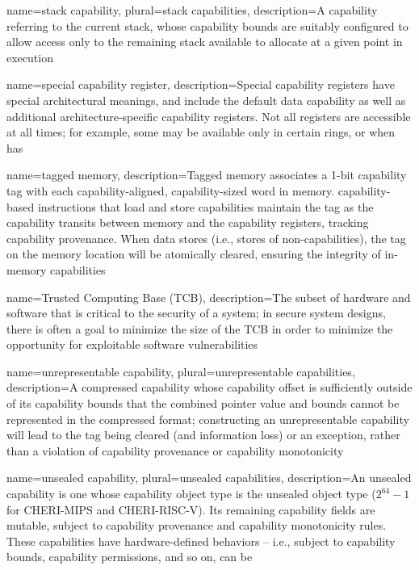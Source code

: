{
  name=stack capability,
  plural=stack capabilities,
  description={A \gls{capability} referring to the current stack, whose
    \gls{capability bounds} are suitably configured to allow access only to
    the remaining stack available to allocate at a given point in execution}
}

{
  name=special capability register,
  description={Special capability registers have special architectural
    meanings, and include the \gls{default data capability} as well
    as additional architecture-specific capability registers.
    Not all registers are accessible at all times; for example, some may be
    available only in certain rings, or when \PCC{} has
    \cappermASR{}}
}

{
  name=tagged memory,
  description={Tagged memory associates a 1-bit \gls{capability tag} with
    each \gls{capability}-aligned, capability-sized word in memory.
    \Gls{capability-based instructions} that load and store capabilities
    maintain the tag as the capability transits between memory and the
    \glspl{capability register}, tracking \gls{capability provenance}.
    When data stores (i.e., stores of non-capabilities), the tag on the
    memory location will be atomically cleared, ensuring the integrity of
    in-memory capabilities}
}

{
  name=Trusted Computing Base (TCB),
  description={The subset of hardware and software that is critical to the
    security of a system;
    in secure system designs, there is often a goal to minimize the size of
    the TCB in order to minimize the opportunity for exploitable software
    vulnerabilities}
}

{
  name=unrepresentable capability,
  plural=unrepresentable capabilities,
  description={A \gls{compressed capability} whose \gls{capability offset} is
    sufficiently outside of its \gls{capability bounds} that the combined
    \gls{pointer} value and bounds cannot be represented in the compressed format;
    constructing an unrepresentable capability will lead to the tag being
    cleared (and information loss) or an exception, rather than a violation
    of \gls{capability provenance} or \gls{capability monotonicity}}
}

{
  name=unsealed capability,
  plural=unsealed capabilities,
  description={An unsealed \gls{capability} is one whose \gls{capability object type}
    is the unsealed object type ($2^{64}-1$ for \gls{CHERI-MIPS} and \gls{CHERI-RISC-V}).
    Its remaining capability fields are mutable, subject to \gls{capability
    provenance} and \gls{capability monotonicity} rules.
    These capabilities have hardware-defined behaviors -- i.e., subject to
    \gls{capability bounds}, \gls{capability permissions}, and so on,
    can be }
}


